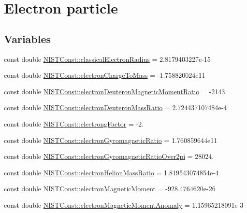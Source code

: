 \hypertarget{group___n_i_s_t_const-_electron}{}\section{Electron particle}
\label{group___n_i_s_t_const-_electron}
\subsection*{Variables}
\begin{DoxyCompactItemize}
\item 
const double \hyperlink{group___n_i_s_t_const-_electron_gac67d6a01d8d75cb66290a36f7123942b}{N\+I\+S\+T\+Const\+::classical\+Electron\+Radius} = 2.\+8179403227e-\/15
\item 
const double \hyperlink{group___n_i_s_t_const-_electron_ga941e6299b6ef4b90cc525c335d9989dc}{N\+I\+S\+T\+Const\+::electron\+Charge\+To\+Mass} = -\/1.\+758820024e11
\item 
const double \hyperlink{group___n_i_s_t_const-_electron_ga3dea53b57010903586a46d81a49fc80f}{N\+I\+S\+T\+Const\+::electron\+Deuteron\+Magnetic\+Moment\+Ratio} = -\/2143.
\item 
const double \hyperlink{group___n_i_s_t_const-_electron_gad526d455579237804ce6194b50782c0e}{N\+I\+S\+T\+Const\+::electron\+Deuteron\+Mass\+Ratio} = 2.\+724437107484e-\/4
\item 
const double \hyperlink{group___n_i_s_t_const-_electron_ga65a20f263f8ef8f324ea6d1879050a66}{N\+I\+S\+T\+Const\+::electrong\+Factor} = -\/2.
\item 
const double \hyperlink{group___n_i_s_t_const-_electron_ga7c738b9078ca0308ee45d3b8bbafadb6}{N\+I\+S\+T\+Const\+::electron\+Gyromagnetic\+Ratio} = 1.\+760859644e11
\item 
const double \hyperlink{group___n_i_s_t_const-_electron_ga67e6ebbd2c2d8043cbdb09979dc7247b}{N\+I\+S\+T\+Const\+::electron\+Gyromagnetic\+Ratio\+Over2pi} = 28024.
\item 
const double \hyperlink{group___n_i_s_t_const-_electron_ga5039598cd8a51d15d9dfbb0463c109d6}{N\+I\+S\+T\+Const\+::electron\+Helion\+Mass\+Ratio} = 1.\+819543074854e-\/4
\item 
const double \hyperlink{group___n_i_s_t_const-_electron_ga81fc83bd665b7b4fb83e9901ed7d6628}{N\+I\+S\+T\+Const\+::electron\+Magnetic\+Moment} = -\/928.\+4764620e-\/26
\item 
const double \hyperlink{group___n_i_s_t_const-_electron_gaf1a0633191464e7a695240858b9b407c}{N\+I\+S\+T\+Const\+::electron\+Magnetic\+Moment\+Anomaly} = 1.\+15965218091e-\/3

\end{DoxyCompactItemize}
